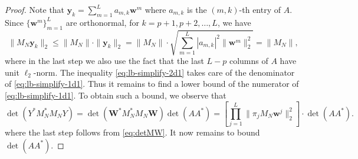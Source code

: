 \documentclass{amsart}
\numberwithin{equation}{section}
\def\corAB{}
\begin{document}
\begin{proof}
\corAB{Note that ${\bm y}_k= \sum_{m=1}^L a_{m,k} {\bm w}^{m}$ where $a_{m,k}$ is the $(m,k)$-th entry of $A$. Since $\{{\bm w}^{m}\}_{m=1}^{L}$ are orthonormal, for $k=p+1,p+2,\ldots,L$, we have
\begin{equation}\label{eq:lb-simplify-2d1}
\|{M}_{N} {\bm y}_k\|_2 \le \|{M}_{N}\| \cdot \|{\bm y}_k\|_2 =  \|{M}_{N}\| \cdot \sqrt{\sum_{m=1}^L |a_{m,k}|^2 \|{\bm w}^{m}\|_2^2}=  \|{M}_{N}\|,
\end{equation}
where in the last step we also use the fact that the last $L-p$ columns of $A$ have unit $\ell_2$-norm. The inequality \eqref{eq:lb-simplify-2d1} takes care of the denominator of \eqref{eq:lb-simplify-1d1}. Thus it remains to find a lower bound of the numerator of \eqref{eq:lb-simplify-1d1}. To obtain such a bound, we observe that
\begin{equation}\label{eq:lb-simplify-3d1}
\det(Y^* {M}_{N}^* {M}_{N} Y)= \det({\bm W}^* {M}_N^* {M}_N {\bm W}) \det(A A^*)= \left[\prod_{j=1}^{\corAB{L}} \|\pi_j M_N {\bm w}^j\|_2^2\right] \cdot \det(A A^*).%
\end{equation}
where the last step follows from \eqref{eq:detMW}. It now remains to bound $\det(A A^*)$.}


\end{proof}
\end{document}
